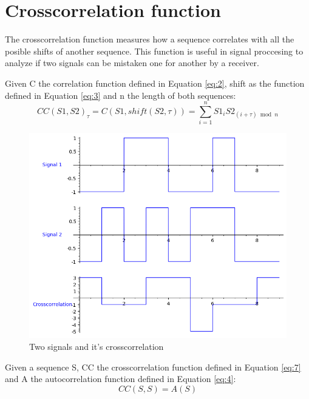 \section{Crosscorrelation function}

The crosscorrelation function measures how a sequence correlates with all
the posible shifts of another sequence. This function is useful in signal
proccesing to analyze if two signals can be mistaken one for another by a
receiver.


\begin{definition}[Crosscorrelation]\label{def:4}
  Given C the correlation function defined in Equation \ref{eq:2}, shift as the function defined in Equation \ref{eq:3} and n the length of both sequences:
  \begin{equation}\label{eq:7}
    CC(S1, S2)_{\tau} = C(S1, shift(S2, \tau)) = \sum_{i=1}^{n}S1_{i}S2_{(i+\tau) \bmod n}
  \end{equation}
\end{definition}

\begin{figure}[ht!] %
\begin{center}
\includegraphics[width=0.7\linewidth]{Chapters/Introduction/signals_crosscorrelation}
\end{center}
\caption{Two signals and it's crosscorrelation}
\label{introduction_signals_crosscorrelation}
\end{figure}

\begin{lemma}\label{lem:1}
  Given a sequence S, CC the crosscorrelation function defined in Equation
  \ref{eq:7} and A the autocorrelation function defined in Equation \ref{eq:4}:
  \begin{equation}\label{eq:8}
    CC(S, S) = A(S)
  \end{equation}
\end{lemma}












